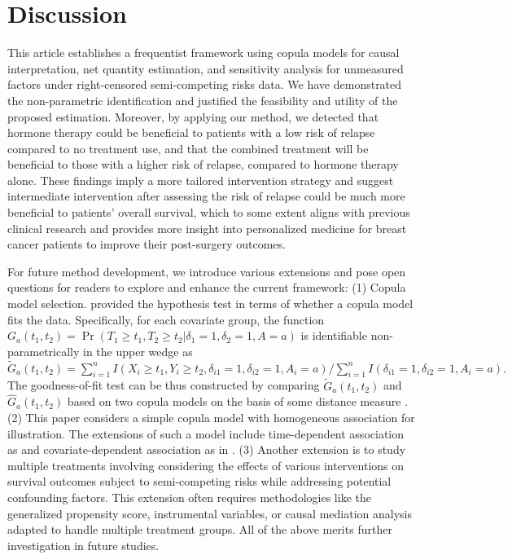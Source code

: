 \documentclass[12pt]{article}
\theoremstyle{plain}
\def\Pr{\operatorname{Pr}}
\begin{document}
\section{Discussion}
\label{sec:conclusion}



This article establishes a frequentist framework using copula models for causal interpretation, net quantity estimation, and sensitivity analysis for unmeasured factors under right-censored semi-competing risks data. We have demonstrated the non-parametric identification and justified the feasibility and utility of the proposed estimation. Moreover, by applying our method, we detected that hormone therapy could be beneficial to patients with a low risk of relapse compared to no treatment use, and that the combined treatment will be beneficial to those with a higher risk of relapse, compared to hormone therapy alone. These findings imply a more tailored intervention strategy and suggest intermediate intervention after assessing the risk of relapse could be much more beneficial to patients' overall survival, which to some extent aligns with previous clinical research \citep{sledge2014} and provides more insight into personalized medicine for breast cancer patients to improve their post-surgery outcomes. %




For future method development, we introduce various extensions and pose open questions for readers to explore and enhance the current framework:  (1) Copula model selection. \cite{hsieh2008} provided the hypothesis test in terms of whether a copula model fits the data. Specifically, for each covariate group, the function $G_a(t_1,t_2) = \Pr(T_1\geq t_1, T_2\geq t_2|\delta_1 = 1,\delta_2 = 1, A=a)$ is identifiable non-parametrically in the upper wedge as
$\widetilde{G}_a (t_1,t_2)= \sum\limits_{i=1}^n I(X_i\geq t_1, Y_i\geq t_2,\delta_{i1}=1,\delta_{i2}=1,A_i=a)/\sum\limits_{i=1}^n I(\delta_{i1}=1,\delta_{i2}=1,A_i=a).$
% 
The goodness-of-fit test can be thus constructed by comparing $\widetilde{G}_a(t_1,t_2)$ and $\widehat{G}_a(t_1,t_2)$ based on two copula models on the basis of some distance measure \citep{hsieh2008}. (2) This paper considers a simple copula model with homogeneous association for illustration.  The extensions of such a model include time-dependent association as \cite{peng2007semicompeting} and covariate-dependent association as in \cite{li2015}. (3) Another extension is to study multiple treatments
involving considering the effects of various interventions on survival outcomes subject to semi-competing risks while addressing potential confounding factors. This extension often requires methodologies like the generalized propensity score, instrumental variables, or causal mediation analysis adapted to handle multiple treatment groups. 
All of the above merits further investigation in future studies.
\end{document}
